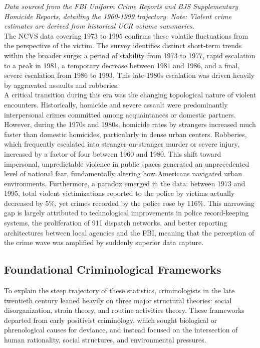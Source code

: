 \documentclass[
]{article}
\begin{document}
\emph{Data sourced from the FBI Uniform Crime Reports and BJS
Supplementary Homicide Reports, detailing the 1960-1999 trajectory.
Note: Violent crime estimates are derived from historical UCR volume
summaries.}\\
The NCVS data covering 1973 to 1995 confirms these volatile fluctuations
from the perspective of the victim. The survey identifies distinct
short-term trends within the broader surge: a period of stability from
1973 to 1977, rapid escalation to a peak in 1981, a temporary decrease
between 1981 and 1986, and a final, severe escalation from 1986 to 1993.
This late-1980s escalation was driven heavily by aggravated assaults and
robberies.\\
A critical transition during this era was the changing topological
nature of violent encounters. Historically, homicide and severe assault
were predominantly interpersonal crimes committed among acquaintances or
domestic partners. However, during the 1970s and 1980s, homicide rates
by strangers increased much faster than domestic homicides, particularly
in dense urban centers. Robberies, which frequently escalated into
stranger-on-stranger murder or severe injury, increased by a factor of
four between 1960 and 1980. This shift toward impersonal, unpredictable
violence in public spaces generated an unprecedented level of national
fear, fundamentally altering how Americans navigated urban environments.
Furthermore, a paradox emerged in the data: between 1973 and 1995, total
violent victimizations reported to the police by victims actually
decreased by 5\%, yet crimes recorded by the police rose by 116\%. This
narrowing gap is largely attributed to technological improvements in
police record-keeping systems, the proliferation of 911 dispatch
networks, and better reporting architectures between local agencies and
the FBI, meaning that the perception of the crime wave was amplified by
suddenly superior data capture.

\subsection{\texorpdfstring{\textbf{Foundational Criminological
Frameworks}}{Foundational Criminological Frameworks}}\label{foundational-criminological-frameworks}

To explain the steep trajectory of these statistics, criminologists in
the late twentieth century leaned heavily on three major structural
theories: social disorganization, strain theory, and routine activities
theory. These frameworks departed from early positivist criminology,
which sought biological or phrenological causes for deviance, and
instead focused on the intersection of human rationality, social
structures, and environmental pressures.
\end{document}
